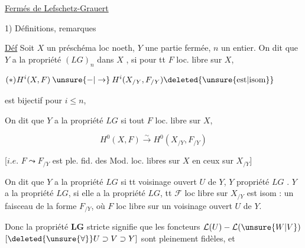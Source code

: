 
\uline{Fermés de Lefschetz-Grauert}

1) Définitions, remarques

\uline{Déf} Soit $X$ un préschéma loc noeth, $Y$ une partie fermée, $n$ un entier. On dit que $Y$ a la propriété $(LG)_n$ dans $X$ , si pour tt $F$ loc. libre sur $X$,

\[
H^i(X,F)\mathbin{\unsure{-|\to}}H^i(X_{/Y},F_{/Y})\deleted{\unsure{\mathrm{est}|\mathrm{isom}}}
\tag*{\makebox[0pt][r]{\makebox[\linewidth][l]{$(\ast)$}}}
\]

est bijectif pour $i\leq n$, 

On dit que $Y$ a la propriété $LG$  si   tout $F$ loc. libre sur $X$,

\[
H^0(X,F)\overset{\sim}{\longrightarrow}H^0(X_{/Y},F_{/Y})
\]

[$i.e.$ $F\leadsto F_{/Y}$ est ple. fid. des Mod. loc. libres sur $X$ en ceux sur $X_{/Y}$]

On dit que $Y$ a la propriété $LG$   si tt  voisinage ouvert $U$ de $Y$, $Y$   propriété $LG$ . \uline{} $Y$ a la propriété $LG$,   si elle a la propriété $LG$,  
tt $\mathcal F$ loc libre sur $X_{/Y}$  est isom : un faisceau de la forme $F_{/Y}$, où $F$ loc libre sur un voisinage ouvert $U$ de $Y$.

Donc la propriété \textbf{LG} stricte signifie que les foncteurs $\mathcal L(U)\mathbin{-}\mathcal L(\unsure{W|V})$ $[\deleted{\unsure{\forall}}U\supset V\supset Y]$ sont pleinement fidèles, et

